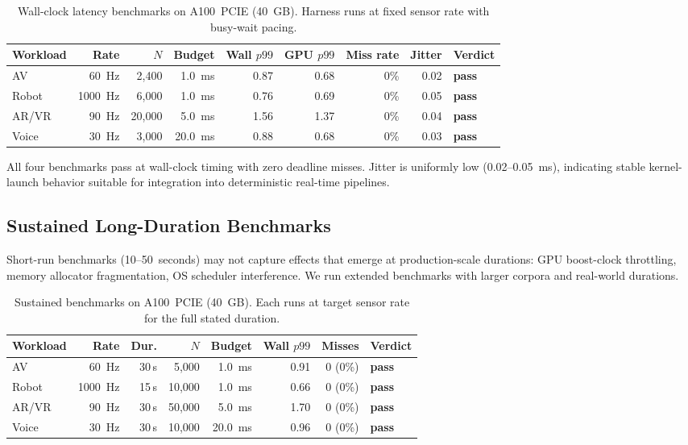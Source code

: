 \documentclass[11pt]{article}
\begin{document}
\begin{table}[ht]
\centering
\small
\caption{Wall-clock latency benchmarks on A100~PCIE (40~GB). Harness
runs at fixed sensor rate with busy-wait pacing.}
\label{tab:wall_clock}
\begin{tabular}{lrrrrrrrl}
\toprule
\textbf{Workload} & \textbf{Rate} & \textbf{$N$} & \textbf{Budget} & \textbf{Wall $p99$} & \textbf{GPU $p99$} & \textbf{Miss rate} & \textbf{Jitter} & \textbf{Verdict} \\
\midrule
AV       &   60~Hz &  2{,}400 &  1.0~ms & 0.87 & 0.68 &  0\% & 0.02 & \textbf{pass} \\
Robot    & 1000~Hz &  6{,}000 &  1.0~ms & 0.76 & 0.69 &  0\% & 0.05 & \textbf{pass} \\
AR/VR    &   90~Hz & 20{,}000 &  5.0~ms & 1.56 & 1.37 &  0\% & 0.04 & \textbf{pass} \\
Voice    &   30~Hz &  3{,}000 & 20.0~ms & 0.88 & 0.68 &  0\% & 0.03 & \textbf{pass} \\
\bottomrule
\end{tabular}
\end{table}

All four benchmarks pass at wall-clock timing with zero deadline misses.
Jitter is uniformly low (0.02--0.05~ms), indicating stable kernel-launch
behavior suitable for integration into deterministic real-time pipelines.

\subsection{Sustained Long-Duration Benchmarks}

Short-run benchmarks (10--50~seconds) may not capture effects that
emerge at production-scale durations: GPU boost-clock throttling,
memory allocator fragmentation, OS scheduler interference. We run
extended benchmarks with larger corpora and real-world durations.

\begin{table}[ht]
\centering
\small
\caption{Sustained benchmarks on A100~PCIE (40~GB). Each runs at target
sensor rate for the full stated duration.}
\label{tab:sustained}
\begin{tabular}{lrrrrrrl}
\toprule
\textbf{Workload} & \textbf{Rate} & \textbf{Dur.} & \textbf{$N$} & \textbf{Budget} & \textbf{Wall $p99$} & \textbf{Misses} & \textbf{Verdict} \\
\midrule
AV        &   60~Hz & 30\,s &  5{,}000 &  1.0~ms & 0.91 &   0 (0\%) & \textbf{pass} \\
Robot     & 1000~Hz & 15\,s & 10{,}000 &  1.0~ms & 0.66 &   0 (0\%) & \textbf{pass} \\
AR/VR     &   90~Hz & 30\,s & 50{,}000 &  5.0~ms & 1.70 &   0 (0\%) & \textbf{pass} \\
Voice     &   30~Hz & 30\,s & 10{,}000 & 20.0~ms & 0.96 &   0 (0\%) & \textbf{pass} \\
\bottomrule
\end{tabular}
\end{table}
\end{document}
